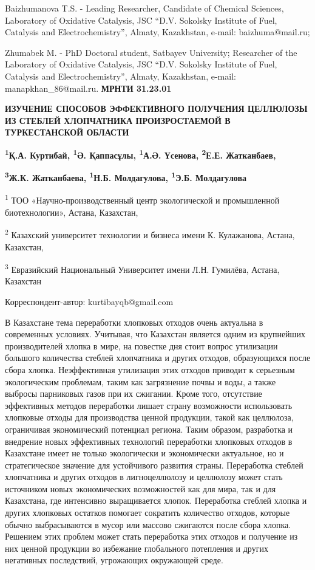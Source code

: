 Baizhumanova T.S. - Leading Researcher, Candidate of Chemical Sciences,
Laboratory of Oxidative Catalysis, JSC ``D.V. Sokolsky Institute of
Fuel, Catalysis and Electrochemistry'', Almaty, Kazakhstan, e-mail:
baizhuma@mail.ru;

Zhumabek M. - PhD Doctoral student, Satbayev University; Researcher of
the Laboratory of Oxidative Catalysis, JSC ``D.V. Sokolsky Institute of
Fuel, Catalysis and Electrochemistry'', Almaty, Kazakhstan, e-mail:
manapkhan\_86@mail.ru.\newpage
{\bfseries МРНТИ 31.23.01}

{\bfseries ИЗУЧЕНИЕ СПОСОБОВ ЭФФЕКТИВНОГО ПОЛУЧЕНИЯ ЦЕЛЛЮЛОЗЫ ИЗ СТЕБЛЕЙ
ХЛОПЧАТНИКА ПРОИЗРОСТАЕМОЙ В ТУРКЕСТАНСКОЙ ОБЛАСТИ}

{\bfseries \textsuperscript{1}Қ.А. Куртибай, \textsuperscript{1}Ә.
Қаппасұлы, \textsuperscript{1}А.Ә. Үсенова, \textsuperscript{2}Е.Е.
Жатканбаев,}

{\bfseries \textsuperscript{3}Ж.К. Жатканбаева, \textsuperscript{1}Н.Б.
Молдагулова, \textsuperscript{1}Э.Б. Молдагулова}

\textsuperscript{1} ТОО «Научно-производственный центр экологической и
промышленной биотехнологии», Астана, Казахстан,

\textsuperscript{2} Казахский университет технологии и бизнеса имени К.
Кулажанова, Астана, Казахстан,

\textsuperscript{3} Евразийский Национальный Университет имени Л.Н.
Гумилёва, Астана, Казахстан

Корреспондент-автор: kurtibayqb@gmail.com

В Казахстане тема переработки хлопковых отходов очень актуальна в
современных условиях. Учитывая, что Казахстан является одним из
крупнейших производителей хлопка в мире, на повестке дня стоит вопрос
утилизации большого количества стеблей хлопчатника и других отходов,
образующихся после сбора хлопка. Неэффективная утилизация этих отходов
приводит к серьезным экологическим проблемам, таким как загрязнение
почвы и воды, а также выбросы парниковых газов при их сжигании. Кроме
того, отсутствие эффективных методов переработки лишает страну
возможности использовать хлопковые отходы для производства ценной
продукции, такой как целлюлоза, ограничивая экономический потенциал
региона. Таким образом, разработка и внедрение новых эффективных
технологий переработки хлопковых отходов в Казахстане имеет не только
экологически и экономически актуальное, но и стратегическое значение для
устойчивого развития страны. Переработка стеблей хлопчатника и других
отходов в лигноцеллюлозу и целлюлозу может стать источником новых
экономических возможностей как для мира, так и для Казахстана, где
интенсивно выращивается хлопок. Переработка стеблей хлопка и других
хлопковых остатков помогает сократить количество отходов, которые обычно
выбрасываются в мусор или массово сжигаются после сбора хлопка. Решением
этих проблем может стать переработка этих отходов и получение из них
ценной продукции во избежание глобального потепления и других негативных
последствий, угрожающих окружающей среде.

